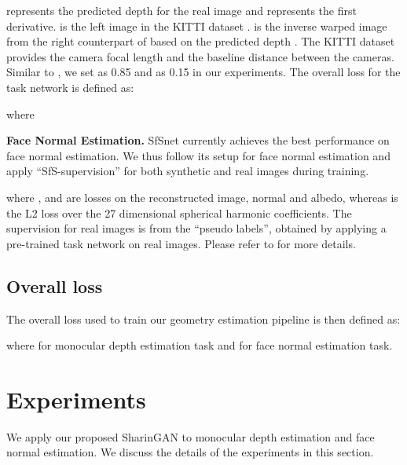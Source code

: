 \documentclass[10pt,twocolumn,letterpaper]{article}
\begin{document}
 represents the predicted depth for the real image and  represents the first derivative.
 is the left image in the KITTI dataset \cite{KITTI}. 
 is the inverse warped image from the right counterpart of  based on the predicted depth .
The KITTI dataset\cite{KITTI} provides the camera focal length and the baseline distance between the cameras. 
Similar to \cite{GASDA}, we set  as 0.85 and  as 0.15 in our experiments.
The overall loss for the task network is defined as:

where 

\textbf{Face Normal Estimation.} 
SfSnet \cite{SfSNet} currently achieves the best performance on face normal estimation.
We thus follow its setup for face normal estimation and apply ``SfS-supervision'' for both synthetic and real images during training.

where ,  and  are  losses on the reconstructed image, normal and albedo, whereas  is the L2 loss over the 27 dimensional spherical harmonic coefficients.
The supervision for real images is from the ``pseudo labels'', obtained by applying a pre-trained task network on real images.
Please refer to \cite{SfSNet} for more details.








\subsection{Overall loss}
The overall loss used to train our geometry estimation pipeline is then defined as:

where  for monocular depth estimation task and  for face normal estimation task.









\section{Experiments}
We apply our proposed SharinGAN to monocular depth estimation and face normal estimation.
We discuss the details of the experiments in this section.
\end{document}
